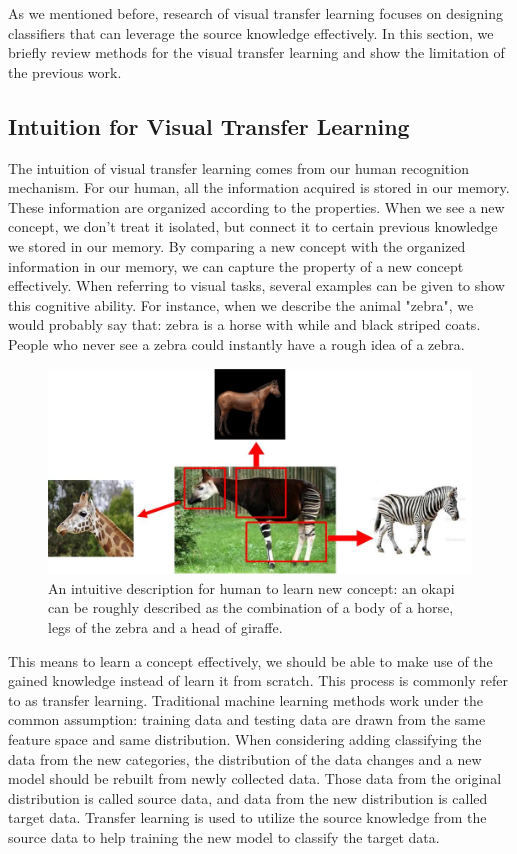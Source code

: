 As we mentioned before, research of visual transfer learning focuses on designing classifiers that can leverage the source knowledge effectively. In this section, we briefly review methods for the visual transfer learning and show the limitation of the previous work. 
\subsection{Intuition for Visual Transfer Learning}
The intuition of visual transfer learning comes from our human recognition mechanism. For our human, all the information acquired is stored in our memory. These information are organized according to the properties. When we see a new concept, we don't treat it isolated, but connect it to certain previous knowledge we stored in our memory. By comparing a new concept with the organized information in our memory, we can capture the property of a new concept effectively. When referring to visual tasks, several examples can be given to show this cognitive ability. For instance, when we describe the animal "zebra", we would probably say that: zebra is a horse with while and black striped coats. People who never see a zebra could instantly have a rough idea of a zebra. 

\begin{figure}
	\centering
	\includegraphics[scale=.6]{introduction/fig/multiple.jpg}
	\caption{An intuitive description for human to learn new concept: an okapi can be roughly described as the combination of a body of a horse, legs of the zebra and a head of giraffe.}\label{fig:intro:multi}
\end{figure}

This means to learn a concept effectively, we should be able to make use of the gained knowledge instead of learn it from scratch. This process is commonly refer to as transfer learning. Traditional machine learning methods work under the common assumption: training data and testing data are drawn from the same feature space and same distribution. When considering adding classifying the data from the new categories, the distribution of the data changes and a new model should be rebuilt from newly collected data. Those data from the original distribution is called source data, and data from the new distribution is called target data. Transfer learning is used to utilize the source knowledge from the source data to help training the new model to classify the target data. 

